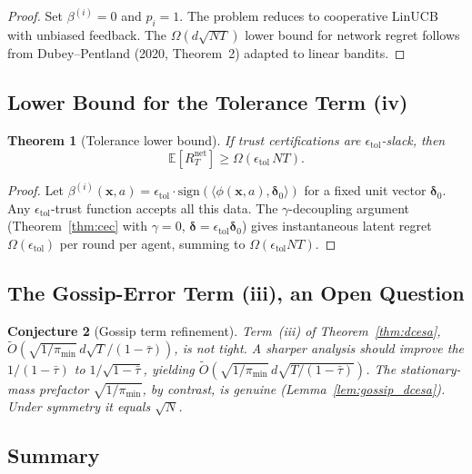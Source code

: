 \documentclass[11pt]{article}
\newtheorem{theorem}{Theorem}[section]
\newtheorem{conjecture}[theorem]{Conjecture}
\begin{document}
\begin{proof}
Set $\beta^{(i)}=0$ and $p_i=1$.  The problem reduces to cooperative
LinUCB with unbiased feedback.  The $\Omega(d\sqrt{NT})$ lower bound
for network regret follows from Dubey--Pentland (2020, Theorem~2)
adapted to linear bandits.
\end{proof}

\subsection{Lower Bound for the Tolerance Term (iv)}

\begin{theorem}[Tolerance lower bound]\label{thm:lower_tol}
If trust certifications are $\epsilon_{\mathrm{tol}}$-slack, then
\[
\mathbb{E}[R_T^{\mathrm{net}}]\geq\Omega(\epsilon_{\mathrm{tol}}\,NT).
\]
\end{theorem}

\begin{proof}
Let $\beta^{(i)}(\bm{x},a)=\epsilon_{\mathrm{tol}}
\cdot\mathrm{sign}(\langle\phi(\bm{x},a),\bm{\delta}_0\rangle)$
for a fixed unit vector $\bm{\delta}_0$.
Any $\epsilon_{\mathrm{tol}}$-trust function accepts all this data.
The $\gamma$-decoupling argument (Theorem~\ref{thm:cec} with
$\gamma=0$, $\bm{\delta}=\epsilon_{\mathrm{tol}}\bm{\delta}_0$)
gives instantaneous latent regret $\Omega(\epsilon_{\mathrm{tol}})$
per round per agent, summing to $\Omega(\epsilon_{\mathrm{tol}}NT)$.
\end{proof}

\subsection{The Gossip-Error Term (iii), an Open Question}

\begin{conjecture}[Gossip term refinement]\label{conj:gossip}
Term~(iii) of Theorem~\ref{thm:dcesa},
$\widetilde{O}(\sqrt{1/\pi_{\min}}\,d\sqrt T/(1-\bar\tau))$, is not tight.
A sharper analysis should improve the $1/(1-\bar\tau)$ to
$1/\sqrt{1-\bar\tau}$, yielding
$\widetilde{O}(\sqrt{1/\pi_{\min}}\,d\sqrt{T/(1-\bar\tau)})$.  The
stationary-mass prefactor $\sqrt{1/\pi_{\min}}$, by contrast, is genuine
(Lemma~\ref{lem:gossip_dcesa}).  Under symmetry it equals $\sqrt N$.
\end{conjecture}

\subsection{Summary}
\end{document}
